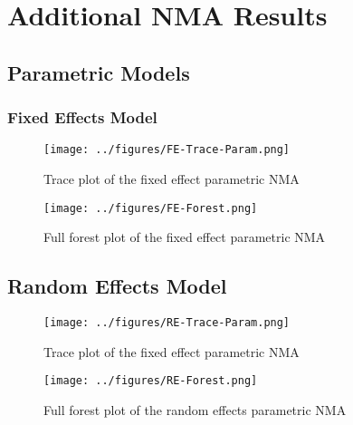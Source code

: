 \chapter{Additional NMA Results}\label{nmaappend}

\section{Parametric Models}

\subsection{Fixed Effects Model}

\begin{figure}[h]
    \center
    \texttt{[image: ../figures/FE-Trace-Param.png]}
    \caption{Trace plot of the fixed effect parametric NMA}
    \label{fig:fe_trace_param}
\end{figure}

\begin{figure}[h]
    \center
    \texttt{[image: ../figures/FE-Forest.png]}
    \caption{Full forest plot of the fixed effect parametric NMA}
    \label{fig:fe_full_forest}
\end{figure}

\section{Random Effects Model}

\begin{figure}[h]
    \center
    \texttt{[image: ../figures/RE-Trace-Param.png]}
    \caption{Trace plot of the fixed effect parametric NMA}
    \label{fig:fe_trace_param}
\end{figure}

\begin{figure}[h]
    \center
    \texttt{[image: ../figures/RE-Forest.png]}
    \caption{Full forest plot of the random effects parametric NMA}
    \label{fig:re_full_forest}
\end{figure}